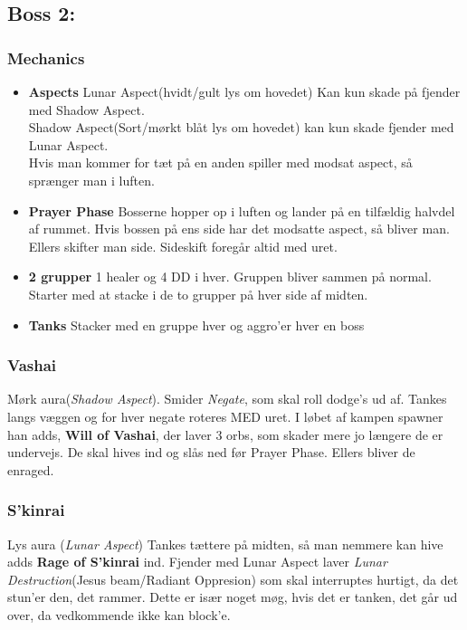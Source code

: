 \subsection*{Boss 2:}
\subsubsection*{Mechanics}
\begin{itemize}
  \item \textbf{Aspects} Lunar Aspect(hvidt/gult lys om hovedet) Kan kun skade
    på fjender med Shadow Aspect.\\
    Shadow Aspect(Sort/mørkt blåt lys om hovedet) kan kun skade fjender med
    Lunar Aspect.\\
    Hvis man kommer for tæt på en anden spiller med modsat aspect, så sprænger
    man i luften.
  \item \textbf{Prayer Phase} Bosserne hopper op i luften og lander på en
    tilfældig halvdel af rummet. Hvis bossen på ens side har det modsatte
    aspect, så bliver man. Ellers skifter man side. Sideskift foregår altid med
    uret.
  \item \textbf{2 grupper} 1 healer og 4 DD i hver. Gruppen bliver sammen på
    normal. Starter med at stacke i de to grupper på hver side af midten. 
  \item \textbf{Tanks} Stacker med en gruppe hver og aggro'er hver en boss

\end{itemize}
\subsubsection*{Vashai}
Mørk aura(\emph{Shadow Aspect}). Smider \emph{Negate}, som skal roll dodge's ud
af. Tankes langs væggen og for hver negate roteres MED uret. I løbet af kampen
spawner han adds, \textbf{Will of Vashai}, der laver 3 orbs, som skader mere jo
længere de er undervejs. De skal hives ind og slås ned før
Prayer Phase. Ellers bliver de enraged.
\subsubsection*{S'kinrai}
Lys aura (\emph{Lunar Aspect}) Tankes tættere på midten, så man nemmere kan
hive adds \textbf{Rage of S'kinrai} ind. Fjender med Lunar Aspect laver
\emph{Lunar Destruction}(Jesus beam/Radiant Oppresion) som skal interruptes
hurtigt, da det stun'er den, det rammer. Dette er især noget møg, hvis det er
tanken, det går ud over, da vedkommende ikke kan block'e.

